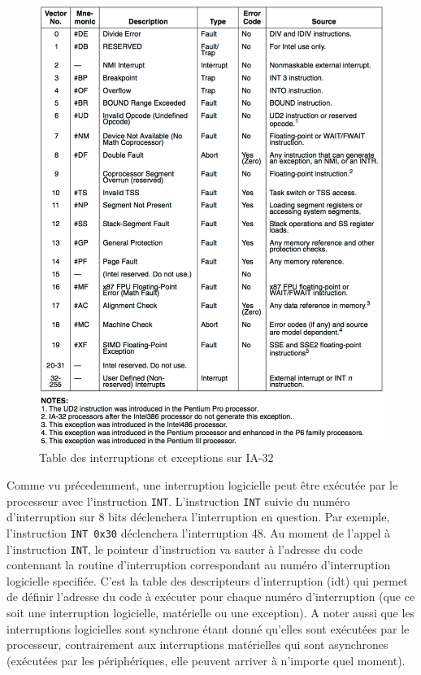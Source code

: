 \begin{figure}[!h]
  \centering
  \includegraphics[scale=0.39]{images/table_int_exc.png}
  \caption{Table des interruptions et exceptions sur \acrshort{IA-32}}
  \label{table_int_exc}
\end{figure}

Comme vu précedemment, une interruption logicielle peut être exécutée par le
processeur avec l'instruction \texttt{INT}. L'instruction \texttt{INT}
suivie du numéro d'interruption sur 8 bits déclenchera l'interruption en question.
Par exemple, l'instruction \texttt{INT 0x30} déclenchera l'interruption
48. Au moment de l'appel à l'instruction \texttt{INT}, le pointeur
d'instruction va sauter à l'adresse du code contennant la routine d'interruption
correspondant au numéro d'interruption logicielle specifiée. C'est la table des
descripteurs d'interruption (\acrshort{idt}) qui permet de définir l'adresse du
code à exécuter pour chaque numéro d'interruption (que ce soit une interruption
logicielle, matérielle ou une exception). A noter aussi que les interruptions
logicielles sont synchrone étant donné qu'elles sont exécutées par le processeur,
contrairement aux interruptions matérielles qui sont asynchrones (exécutées par
les périphériques, elle peuvent arriver à n'importe quel moment). \\

